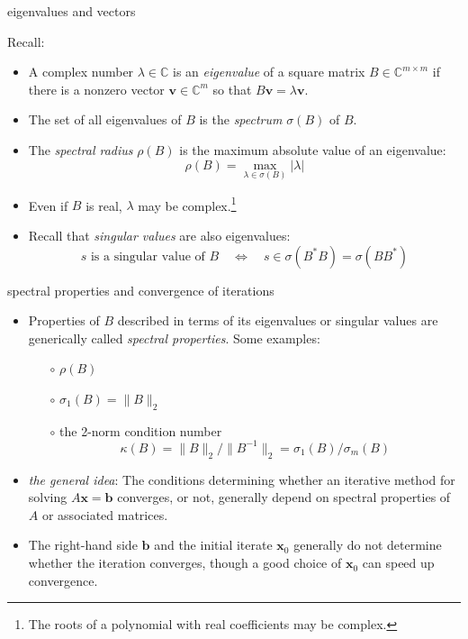 \documentclass[10pt,hyperref]{beamer}
\newcommand{\bb}{\mathbf{b}}
\newcommand{\bx}{\mathbf{x}}
\newcommand{\bv}{\mathbf{v}}
\newcommand{\CC}{\mathbb{C}}
\begin{document}
\begin{frame}{eigenvalues and vectors}

Recall:
\begin{itemize}
\item A complex number $\lambda \in \CC$ is an \emph{eigenvalue} of a square matrix $B\in\CC^{m\times m}$ if there is a nonzero vector $\bv\in\CC^m$ so that $B \bv = \lambda \bv$.
\item The set of all eigenvalues of $B$ is the \emph{spectrum} $\sigma(B)$ of $B$.
\item The \emph{spectral radius} $\rho(B)$ is the maximum absolute value of an eigenvalue:
    $$\rho(B) = \max_{\lambda\in\sigma(B)}  |\lambda|$$
\item Even if $B$ is real, $\lambda$ may be complex.\footnote{The roots of a polynomial with real coefficients may be complex.}
\item Recall that \emph{singular values} are also eigenvalues:
    $$s \text{ is a singular value of } B \quad \iff \quad s \in \sigma(B^* B) = \sigma(B B^*)$$
\end{itemize}
\end{frame}


\begin{frame}{spectral properties and convergence of iterations}

\begin{itemize}
\item Properties of $B$ described in terms of its eigenvalues or singular values are generically called \emph{spectral properties}.  Some examples:
  \begin{itemize}
  \item[$\circ$] $\rho(B)$
  \item[$\circ$] $\sigma_1(B)=\|B\|_2$
  \item[$\circ$] the 2-norm condition number
    $$\kappa(B)=\|B\|_2/\|B^{-1}\|_2 = \sigma_1(B) / \sigma_m(B)$$
  \end{itemize}
\item \emph{the general idea}:  The conditions determining whether an iterative method for solving $A\bx = \bb$ converges, or not, generally depend on spectral properties of $A$ or associated matrices.
\item The right-hand side $\bb$ and the initial iterate $\bx_0$ generally do not determine whether the iteration converges, though a good choice of $\bx_0$ can speed up convergence.
\end{itemize}
\end{frame}
\end{document}
